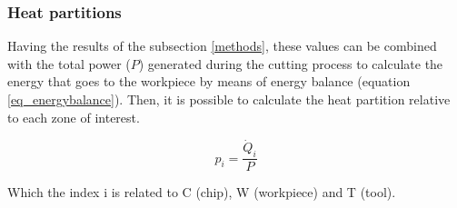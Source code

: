 		\subsubsection{Heat partitions}
		Having the results of the subsection \ref{methods}, these values can be combined with the total power ($P$) generated during the cutting process to calculate the energy that goes to the workpiece by means of energy balance (equation \ref{eq_energybalance}). Then, it is possible to calculate the heat partition relative to each zone of interest.

		\begin{equation} 
		\label{eq_heatpartition}
		p_{i} = \frac{\dot{Q}_{i}}{P}
		\end{equation}

		Which the index i is related to C (chip), W (workpiece) and T (tool).
